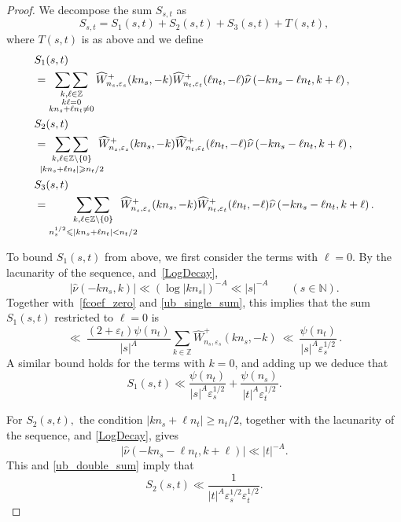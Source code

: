 \documentclass[12pt, reqno]{amsart}
\theoremstyle{definition}
\theoremstyle{remark}
\numberwithin{equation}{section}
\newcommand{\what}[1]{\widehat{#1}}
\def\ls{\leqslant} \def\gs{\geqslant}
\def\geq{\geqslant}
\def \bN {\mathbb N}
\def \bZ {\mathbb Z}
\begin{document}
\begin{proof}
We decompose the sum $S_{s,t}$ as
\[
S_{s,t} = %
S_1(s,t) + S_2(s,t) + S_3(s,t) + T(s,t),
\] where $T(s,t)$ is as above and we define 
\begin{align*}
&S_1(s,t) \\ &= \mathop{\sum\sum}_{\substack{ k,\ell\in\mathbb{Z} \\ k \ell = 0 \\ k n_s + \ell n_t \ne 0}}
\what{W}_{n_s,\varepsilon_s}^{+}(kn_s,-k)\what{W}_{n_t,\varepsilon_t}^{+}(\ell n_t,-\ell)  \what{\nu}\left( -kn_s-\ell n_t,k+\ell\right),\\
&S_2(s,t) \\ &= \!\!\!\!\! \mathop{ \mathop{\sum\sum}_{ k,\ell\in\mathbb{Z}\setminus \{0\} } }_{ |kn_s+\ell n_t|\gs n_t/2} \!\!\!\!\what{W}_{n_s,\varepsilon_s}^{+}(kn_s,-k)\what{W}_{n_t,\varepsilon_t}^{+}(\ell n_t,-\ell)  \what{\nu}\left( -kn_s-\ell n_t,k+\ell\right), \\
&S_3(s,t) \\ &= \mathop{ \mathop{\sum\sum}_{ k,\ell\in\mathbb{Z}\setminus \{0\} } }_{n_s^{1/2} \ls|kn_s+\ell n_t| < n_t/2} \hspace{-6mm}\what{W}_{n_s,\varepsilon_s}^{+}(kn_s,-k)\what{W}_{n_t,\varepsilon_t}^{+}(\ell n_t,-\ell)  \what{\nu}\left(-kn_s-\ell n_t,k+\ell\right).
\end{align*}

To bound $S_1(s,t)$ from above, we first consider the terms with $\ell=0$. By the
lacunarity of the sequence, and~\eqref{LogDecay},
\[
|\widehat{\nu}(-k n_s,k)|\ll \left(\log|kn_s|\right)^{-A}\ll |s|^{-A} \qquad (s \in \bN).
\]
Together with~\eqref{fcoef_zero} and \eqref{ub_single_sum}, this
implies that the sum $S_1(s,t)$ restricted to $\ell = 0$ is 
\[
\ll \  \frac{(2+\varepsilon_t)\psi(n_t)}{|s|^{A}}\sum_{k\in \bZ }  \widehat{W}_{n_s,\varepsilon_s}^{+}(k n_s,-k)  \ \ll \
\frac{\psi(n_t)}{|s|^{A}\varepsilon_s^{1/2}}\, .
\]
A similar bound holds for the terms with $k=0$, and adding up we deduce that
\begin{equation} \label{ub_S1}
S_1(s,t) \ll
\frac{\psi(n_t)}{|s|^{A}\varepsilon_s^{1/2}} + \frac{\psi(n_s)}{|t|^{A}\varepsilon_t^{1/2}}.
\end{equation}

For $S_2(s,t),$ the condition $|k n_s+\ell n_t|\geq n_t/2$, together with the lacunarity of the sequence,
and \eqref{LogDecay}, gives
\[
|\widehat{\nu}\left( -k n_s - \ell n_t,k+\ell\right)| \ll |t|^{-A}.
\]
This and \eqref{ub_double_sum} imply that
\begin{equation} \label{ub_S2}
S_2(s,t) \ll \frac{1}{|t|^{A}\varepsilon_s^{1/2}\varepsilon_t^{1/2}}.
\end{equation}


\end{proof}
\end{document}
